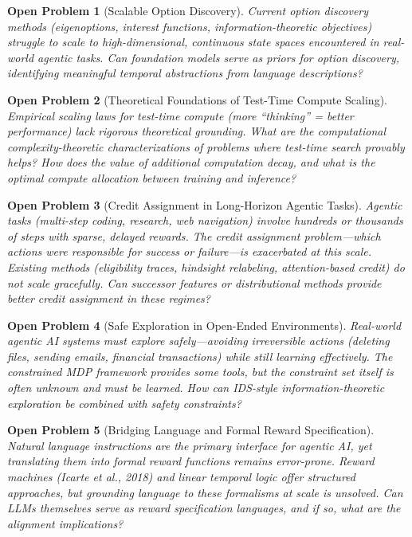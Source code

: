 \documentclass[11pt,a4paper]{article}
\newtheorem{openproblem}{Open Problem}
\begin{document}
\begin{openproblem}[Scalable Option Discovery]
Current option discovery methods (eigenoptions, interest functions, information-theoretic
objectives) struggle to scale to high-dimensional, continuous state spaces
encountered in real-world agentic tasks. Can foundation models serve as
priors for option discovery, identifying meaningful temporal abstractions
from language descriptions?
\end{openproblem}

\begin{openproblem}[Theoretical Foundations of Test-Time Compute Scaling]
Empirical scaling laws for test-time compute (more ``thinking'' = better performance)
lack rigorous theoretical grounding. What are the computational complexity-theoretic
characterizations of problems where test-time search provably helps?
How does the value of additional computation decay, and what is the optimal
compute allocation between training and inference?
\end{openproblem}

\begin{openproblem}[Credit Assignment in Long-Horizon Agentic Tasks]
Agentic tasks (multi-step coding, research, web navigation) involve hundreds or
thousands of steps with sparse, delayed rewards. The credit assignment problem---which
actions were responsible for success or failure---is exacerbated at this scale.
Existing methods (eligibility traces, hindsight relabeling, attention-based credit)
do not scale gracefully. Can successor features or distributional methods provide
better credit assignment in these regimes?
\end{openproblem}

\begin{openproblem}[Safe Exploration in Open-Ended Environments]
Real-world agentic AI systems must explore safely---avoiding irreversible
actions (deleting files, sending emails, financial transactions) while still
learning effectively. The constrained MDP framework provides some tools, but
the constraint set itself is often unknown and must be learned. How can
IDS-style information-theoretic exploration be combined with safety constraints?
\end{openproblem}

\begin{openproblem}[Bridging Language and Formal Reward Specification]
Natural language instructions are the primary interface for agentic AI, yet
translating them into formal reward functions remains error-prone. Reward
machines (Icarte et al., 2018) and linear temporal logic offer structured
approaches, but grounding language to these formalisms at scale is unsolved.
Can LLMs themselves serve as reward specification languages, and if so,
what are the alignment implications?
\end{openproblem}
\end{document}
